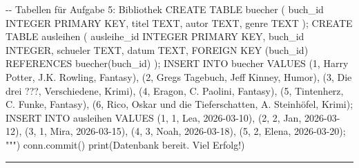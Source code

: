 \documentclass[
  nswissgerman,
  a4paper,
  DIV=11,
  numbers=noendperiod,
  ngerman]{scrreprt}
\newenvironment{Shaded}{\begin{snugshade}}{\end{snugshade}}
\newcommand{\BuiltInTok}[1]{\textcolor[rgb]{0.00,0.23,0.31}{#1}}
\newcommand{\NormalTok}[1]{\textcolor[rgb]{0.00,0.23,0.31}{#1}}
\newcommand{\StringTok}[1]{\textcolor[rgb]{0.13,0.47,0.30}{#1}}
\begin{document}
\begin{Shaded}
\begin{Highlighting}[numbers=left,,]
\StringTok{{-}{-} Tabellen für Aufgabe 5: Bibliothek}
\StringTok{CREATE TABLE buecher (}
\StringTok{    buch\_id INTEGER PRIMARY KEY,}
\StringTok{    titel   TEXT,}
\StringTok{    autor   TEXT,}
\StringTok{    genre   TEXT}
\StringTok{);}
\StringTok{CREATE TABLE ausleihen (}
\StringTok{    ausleihe\_id INTEGER PRIMARY KEY,}
\StringTok{    buch\_id     INTEGER,}
\StringTok{    schueler    TEXT,}
\StringTok{    datum       TEXT,}
\StringTok{    FOREIGN KEY (buch\_id) REFERENCES buecher(buch\_id)}
\StringTok{);}
\StringTok{INSERT INTO buecher VALUES}
\StringTok{    (1, \textquotesingle{}Harry Potter\textquotesingle{}, \textquotesingle{}J.K. Rowling\textquotesingle{}, \textquotesingle{}Fantasy\textquotesingle{}),}
\StringTok{    (2, \textquotesingle{}Gregs Tagebuch\textquotesingle{}, \textquotesingle{}Jeff Kinney\textquotesingle{}, \textquotesingle{}Humor\textquotesingle{}),}
\StringTok{    (3, \textquotesingle{}Die drei ???\textquotesingle{}, \textquotesingle{}Verschiedene\textquotesingle{}, \textquotesingle{}Krimi\textquotesingle{}),}
\StringTok{    (4, \textquotesingle{}Eragon\textquotesingle{}, \textquotesingle{}C. Paolini\textquotesingle{}, \textquotesingle{}Fantasy\textquotesingle{}),}
\StringTok{    (5, \textquotesingle{}Tintenherz\textquotesingle{}, \textquotesingle{}C. Funke\textquotesingle{}, \textquotesingle{}Fantasy\textquotesingle{}),}
\StringTok{    (6, \textquotesingle{}Rico, Oskar und die Tieferschatten\textquotesingle{}, \textquotesingle{}A. Steinhöfel\textquotesingle{}, \textquotesingle{}Krimi\textquotesingle{});}
\StringTok{INSERT INTO ausleihen VALUES}
\StringTok{    (1, 1, \textquotesingle{}Lea\textquotesingle{},   \textquotesingle{}2026{-}03{-}10\textquotesingle{}),}
\StringTok{    (2, 2, \textquotesingle{}Jan\textquotesingle{},   \textquotesingle{}2026{-}03{-}12\textquotesingle{}),}
\StringTok{    (3, 1, \textquotesingle{}Mira\textquotesingle{},  \textquotesingle{}2026{-}03{-}15\textquotesingle{}),}
\StringTok{    (4, 3, \textquotesingle{}Noah\textquotesingle{},  \textquotesingle{}2026{-}03{-}18\textquotesingle{}),}
\StringTok{    (5, 2, \textquotesingle{}Elena\textquotesingle{}, \textquotesingle{}2026{-}03{-}20\textquotesingle{});}
\StringTok{"""}\NormalTok{)}
\NormalTok{conn.commit()}
\BuiltInTok{print}\NormalTok{(}\StringTok{\textquotesingle{}Datenbank bereit. Viel Erfolg!\textquotesingle{}}\NormalTok{)}
\end{Highlighting}
\end{Shaded}

\begin{center}\rule{0.5\linewidth}{0.5pt}\end{center}
\end{document}
